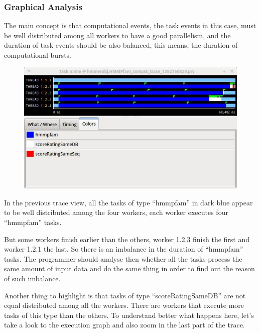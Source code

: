 \subsubsection{Graphical Analysis}

The main concept is that computational events, the task events in this case, must be well 
distributed among all workers to have a good parallelism, and the duration of task events 
should be also balanced, this means, the duration of computational bursts.

\begin{figure}[ht!]
  \centering
    \includegraphics[width=1.0\textwidth]{./Sections/7_Tracing/Figures/8.jpeg}
\end{figure}

In the previous trace view, all the tasks of type ``hmmpfam'' in dark blue appear to be well 
distributed among the four workers, each worker executes four ``hmmpfam'' tasks.

But some workers finish earlier than the others, worker 1.2.3 finish the first and worker 1.2.1 
the last. So there is an imbalance in the duration of ``hmmpfam'' tasks. The programmer should 
analyse then whether all the tasks process the same amount of input data and do the same thing 
in order to find out the reason of such imbalance.

Another thing to highlight is that tasks of type ``scoreRatingSameDB'' are not equal distributed 
among all the workers. There are workers that execute more tasks of this type than the others. 
To understand better what happens here, let’s take a look to the execution graph and also zoom 
in the last part of the trace.

